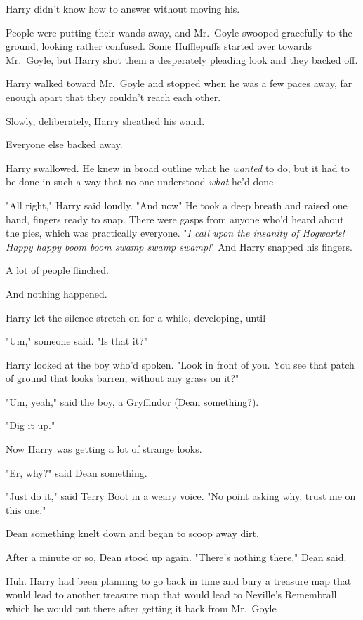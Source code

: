 Harry didn't know how to answer without moving his.

People were putting their wands away, and Mr.~Goyle swooped gracefully to the
ground, looking rather confused. Some Hufflepuffs started over towards
Mr.~Goyle, but Harry shot them a desperately pleading look and they backed off.

Harry walked toward Mr.~Goyle and stopped when he was a few paces away, far
enough apart that they couldn't reach each other.

Slowly, deliberately, Harry sheathed his wand.

Everyone else backed away.

Harry swallowed. He knew in broad outline what he \emph{wanted} to do, but it
had to be done in such a way that no one understood \emph{what} he'd done\mbox{---}

"All right," Harry said loudly. "And now{\el}" He took a deep breath and
raised one hand, fingers ready to snap. There were gasps from anyone who'd
heard about the pies, which was practically everyone. "\emph{I call upon the
insanity of Hogwarts! Happy happy boom boom swamp swamp swamp!}" And Harry
snapped his fingers.

A lot of people flinched.

And nothing happened.

Harry let the silence stretch on for a while, developing, until{\el}

"Um," someone said. "Is that it?"

Harry looked at the boy who'd spoken. "Look in front of you. You see that patch
of ground that looks barren, without any grass on it?"

"Um, yeah," said the boy, a Gryffindor (Dean something?).

"Dig it up."

Now Harry was getting a lot of strange looks.

"Er, why?" said Dean something.

"Just do it," said Terry Boot in a weary voice. "No point asking why, trust me
on this one."

Dean something knelt down and began to scoop away dirt.

After a minute or so, Dean stood up again. "There's nothing there," Dean said.

Huh. Harry had been planning to go back in time and bury a treasure map that
would lead to another treasure map that would lead to Neville's Remembrall
which he would put there after getting it back from Mr.~Goyle{\el}

